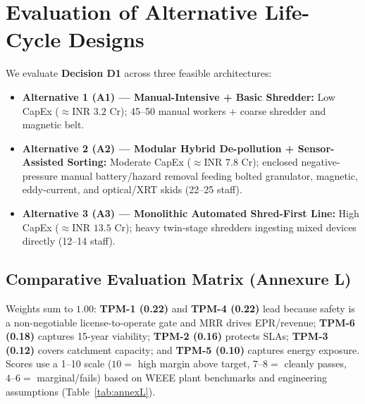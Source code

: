 \section{Evaluation of Alternative Life-Cycle Designs}
\label{sec:H}

We evaluate \textbf{Decision D1} across three feasible architectures:
\begin{itemize}
    \item \textbf{Alternative 1 (A1) --- Manual-Intensive + Basic Shredder:} Low CapEx ($\approx\text{INR } 3.2\text{ Cr}$); 45--50 manual workers + coarse shredder and magnetic belt.
    \item \textbf{Alternative 2 (A2) --- Modular Hybrid De-pollution + Sensor-Assisted Sorting:} Moderate CapEx ($\approx\text{INR } 7.8\text{ Cr}$); enclosed negative-pressure manual battery/hazard removal feeding bolted granulator, magnetic, eddy-current, and optical/XRT skids (22--25 staff).
    \item \textbf{Alternative 3 (A3) --- Monolithic Automated Shred-First Line:} High CapEx ($\approx\text{INR } 13.5\text{ Cr}$); heavy twin-stage shredders ingesting mixed devices directly (12--14 staff).
\end{itemize}

\subsection{Comparative Evaluation Matrix (Annexure L)}
Weights sum to $1.00$: \textbf{TPM-1 (0.22)} and \textbf{TPM-4 (0.22)} lead because safety is a non-negotiable license-to-operate gate and MRR drives EPR/revenue; \textbf{TPM-6 (0.18)} captures 15-year viability; \textbf{TPM-2 (0.16)} protects SLAs; \textbf{TPM-3 (0.12)} covers catchment capacity; and \textbf{TPM-5 (0.10)} captures energy exposure. Scores use a 1--10 scale ($10=$ high margin above target, $7\text{--}8=$ cleanly passes, $4\text{--}6=$ marginal/fails) based on WEEE plant benchmarks and engineering assumptions (Table~\ref{tab:annexL}).

